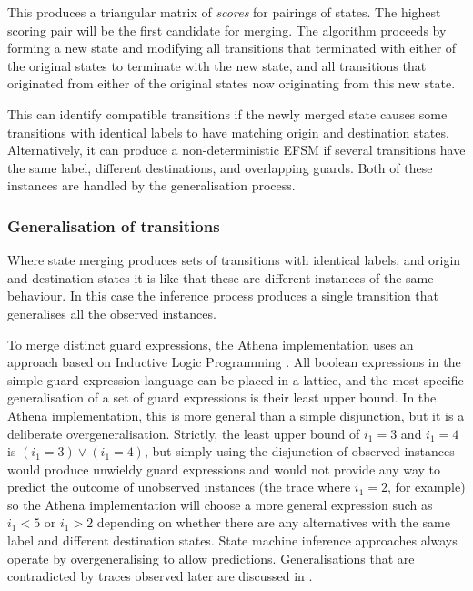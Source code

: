 This produces a triangular matrix of \emph{scores} for pairings of states. The highest scoring pair will be the first candidate for merging. The algorithm proceeds by forming a new state and modifying all transitions that terminated with either of the original states to terminate with the new state, and all transitions that originated from either of the original states now originating from this new state.

This can identify compatible transitions if the newly merged state causes some transitions with identical labels to have matching origin and destination states. Alternatively, it can produce a non-deterministic EFSM if several transitions have the same label, different destinations, and overlapping guards. Both of these instances are handled by the generalisation process.

\subsubsection{Generalisation of transitions}
\label{Generalisation}

Where state merging produces sets of transitions with identical labels, and origin and destination states it is like that these are different instances of the same behaviour. In this case the inference process produces a single transition that generalises all the observed instances.

To merge distinct guard expressions, the Athena implementation uses an approach based on Inductive Logic Programming \cite{ILP}. All boolean expressions in the simple guard expression language can be placed in a lattice, and the most specific generalisation of a set of guard expressions is their least upper bound. In the Athena implementation, this is more general than a simple disjunction, but it is a deliberate overgeneralisation. Strictly, the least upper bound of $i_1 = 3$ and $i_1 = 4$ is $(i_1 = 3) \lor (i_1 = 4)$, but simply using the disjunction of observed instances would produce unwieldy guard expressions and would not provide any way to predict the outcome of unobserved instances (the trace where $i_1 = 2$, for example) so the Athena implementation will choose a more general expression such as $i_1 < 5$ or $i_1 > 2$ depending on whether there are any alternatives with the same label and different destination states. State machine inference approaches always operate by overgeneralising to allow predictions. Generalisations that are contradicted by traces observed later are discussed in .

